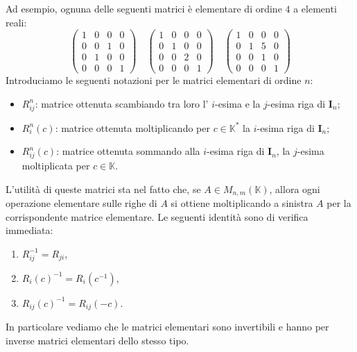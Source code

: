 \documentclass{article}
\theoremstyle{plain}
\theoremstyle{definition}
\theoremstyle{remark}
\begin{document}
Ad esempio, ognuna delle seguenti matrici è elementare di ordine $4$ a elementi reali:
\[
\begin{pmatrix}
1 & 0 & 0 & 0 \\
0 & 0 & 1 & 0 \\
0 & 1 & 0 & 0 \\
0 & 0 & 0 & 1
\end{pmatrix} \quad
\begin{pmatrix}
1 & 0 & 0 & 0 \\
0 & 1 & 0 & 0 \\
0 & 0 & 2 & 0 \\
0 & 0 & 0 & 1
\end{pmatrix} \quad
\begin{pmatrix}
1 & 0 & 0 & 0 \\
0 & 1 & 5 & 0 \\
0 & 0 & 1 & 0 \\
0 & 0 & 0 & 1
\end{pmatrix}
\]
Introduciamo le seguenti notazioni per le matrici elementari di ordine \(n\):
\begin{itemize}
    \item \(R_{ij}^n\): matrice ottenuta scambiando tra loro l' \(i\)-esima e la \(j\)-esima riga di \(\mathbf{I}_n\);
    \item \(R_i^n(c)\): matrice ottenuta moltiplicando per \(c \in \mathbb{K}^*\) la \(i\)-esima riga di \(\mathbf{I}_n\);
    \item \(R_{ij}^n(c)\): matrice ottenuta sommando alla \(i\)-esima riga di \(\mathbf{I}_n\), la \(j\)-esima moltiplicata per \(c \in \mathbb{K}\).
\end{itemize}
L'utilità di queste matrici sta nel fatto che, se \(A \in M_{n,m}(\mathbb{K})\), allora ogni operazione elementare sulle righe di \(A\) si 
ottiene moltiplicando a sinistra \(A\) per la corrispondente matrice elementare.
Le seguenti identità sono di verifica immediata:
\begin{enumerate}
    \item \(R_{ij}^{-1} = R_{ji}\),
    \item \(R_{i}(c)^{-1} = R_{i}(c^{-1})\),
    \item \(R_{ij}(c)^{-1} = R_{ij}(-c)\).
\end{enumerate}
In particolare vediamo che le matrici elementari sono invertibili e hanno per inverse matrici elementari dello stesso tipo.

\vspace{10pt}
\end{document}
